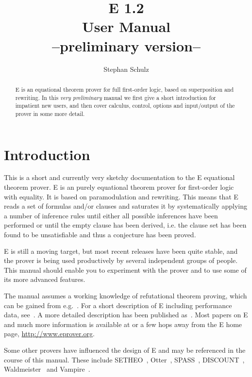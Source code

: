 \documentclass{article}
\author{Stephan Schulz}
\title{E 1.2\\[1.5ex]User Manual\\[1.5ex]{\normalsize --preliminary
    version--}}
\begin{document}
\maketitle{}

\begin{abstract}
  E is an equational theorem prover for full first-order logic, based
  on superposition and rewriting. In this \emph{very preliminary}
  manual we first give a short introduction for impatient new users,
  and then cover calculus, control, options and input/output of the
  prover in some more detail.
\end{abstract}

\tableofcontents{}

\section{Introduction}
\label{sec:intro}

This is a short and currently very sketchy documentation to the E
equational theorem prover. E is an purely equational theorem prover
for first-order logic with equality. It is based on paramodulation and
rewriting. This means that E reads a set of formulas and/or clauses
and saturates it by systematically applying a number of inference
rules until either all possible inferences have been performed or
until the empty clause has been derived, i.e. the clause set has been
found to be unsatisfiable and thus a conjecture has been proved.

E is still a moving target, but most recent releases have been quite
stable, and the prover is being used productively by several
independent groups of people. This manual should enable you to
experiment with the prover and to use some of its more advanced
features.

The manual assumes a working knowledge of refutational theorem
proving, which can be gained from e.g.~\cite{CL73}. For a short
description of E including performance data,
see~\cite{Schulz:IJCAR-2004}. A more detailed description has been
published as~\cite{Schulz:AICOM-2002}. Most papers on E and much more
information is available at or a few hops away from the E home page,
\url{http://www.eprover.org}.

Some other provers have influenced the design of E and may be
referenced in the course of this manual. These include
SETHEO~\cite{MILSGSM:JAR-97}, Otter~\cite{Mc94,MW:JAR-97},
SPASS~\cite{WGR96,WABCEKTT:CADE-99}, DISCOUNT~\cite{DKS97},
Waldmeister~\cite{BHF96,HJL:CADE-99} and
Vampire~\cite{RV:AICOM-2002,RV:IJCAR-2001}.
\end{document}
